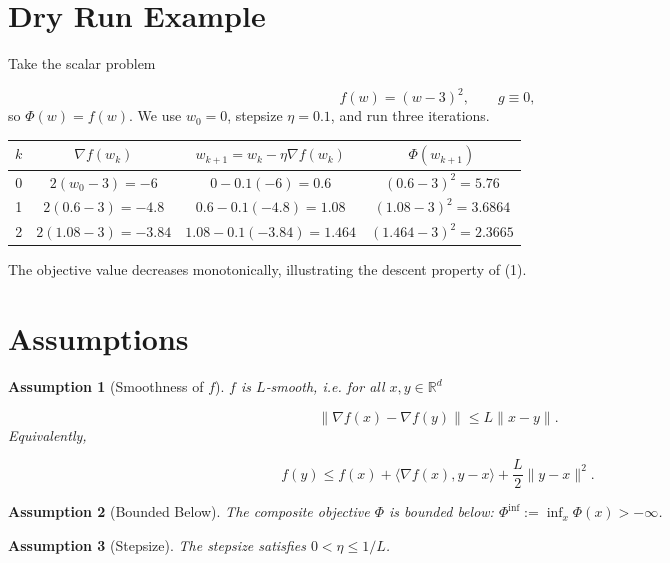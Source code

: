 \documentclass{article}
\newtheorem{assumption}{Assumption}
\newcommand{\grad}{\nabla}
\newcommand{\R}{\mathbb{R}}
\begin{document}
\section*{Dry Run Example}
Take the scalar problem  

\[
f(w)=(w-3)^{2},\qquad g\equiv0,
\]
so $\Phi(w)=f(w)$.  
We use $w_{0}=0$, stepsize $\eta=0.1$, and run three iterations.

\begin{center}
\begin{tabular}{c|c|c|c}
$k$ & $\grad f(w_{k})$ & $w_{k+1}=w_{k}-\eta\grad f(w_{k})$ & $\Phi(w_{k+1})$\\ \hline
0 & $2(w_{0}-3)=-6$ & $0-0.1(-6)=0.6$ & $(0.6-3)^{2}=5.76$\\
1 & $2(0.6-3)=-4.8$ & $0.6-0.1(-4.8)=1.08$ & $(1.08-3)^{2}=3.6864$\\
2 & $2(1.08-3)=-3.84$ & $1.08-0.1(-3.84)=1.464$ & $(1.464-3)^{2}=2.3665$
\end{tabular}
\end{center}

The objective value decreases monotonically, illustrating the descent property of (1).

\newpage

\section*{Assumptions}
\begin{assumption}[Smoothness of $f$]\label{ass:L}
$f$ is $L$‑smooth, i.e. for all $x,y\in\R^{d}$  

\[
\|\grad f(x)-\grad f(y)\|\le L\|x-y\|.
\]
Equivalently,  

\[
f(y)\le f(x)+\langle\grad f(x),y-x\rangle+\frac{L}{2}\|y-x\|^{2}. \tag{2}
\]
\end{assumption}

\begin{assumption}[Bounded Below]\label{ass:bound}
The composite objective $\Phi$ is bounded below: $\Phi^{\inf}:=\inf_{x}\Phi(x)>-\infty$.
\end{assumption}

\begin{assumption}[Stepsize]\label{ass:step}
The stepsize satisfies $0<\eta\le 1/L$.
\end{assumption}
\end{document}
